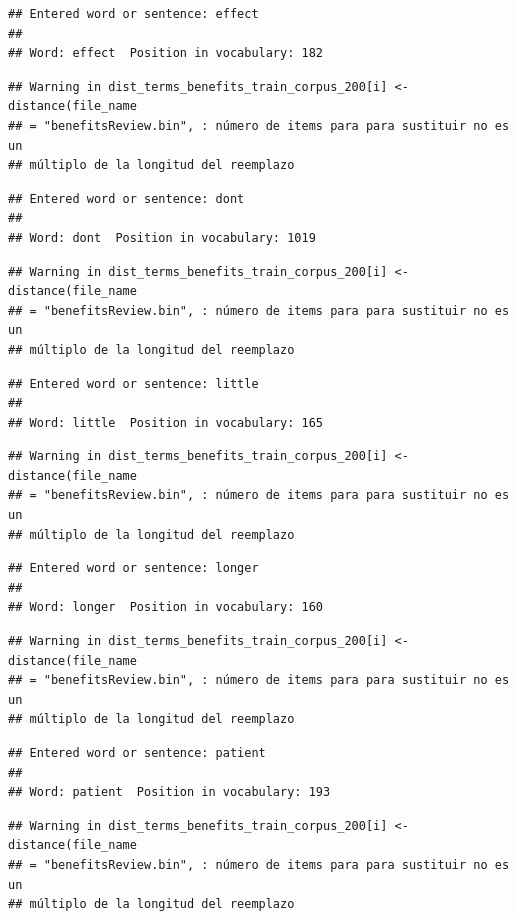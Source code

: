\documentclass[spanish,]{article}
\begin{document}
\begin{verbatim}
## Entered word or sentence: effect
## 
## Word: effect  Position in vocabulary: 182
\end{verbatim}

\begin{verbatim}
## Warning in dist_terms_benefits_train_corpus_200[i] <- distance(file_name
## = "benefitsReview.bin", : número de items para para sustituir no es un
## múltiplo de la longitud del reemplazo
\end{verbatim}

\begin{verbatim}
## Entered word or sentence: dont
## 
## Word: dont  Position in vocabulary: 1019
\end{verbatim}

\begin{verbatim}
## Warning in dist_terms_benefits_train_corpus_200[i] <- distance(file_name
## = "benefitsReview.bin", : número de items para para sustituir no es un
## múltiplo de la longitud del reemplazo
\end{verbatim}

\begin{verbatim}
## Entered word or sentence: little
## 
## Word: little  Position in vocabulary: 165
\end{verbatim}

\begin{verbatim}
## Warning in dist_terms_benefits_train_corpus_200[i] <- distance(file_name
## = "benefitsReview.bin", : número de items para para sustituir no es un
## múltiplo de la longitud del reemplazo
\end{verbatim}

\begin{verbatim}
## Entered word or sentence: longer
## 
## Word: longer  Position in vocabulary: 160
\end{verbatim}

\begin{verbatim}
## Warning in dist_terms_benefits_train_corpus_200[i] <- distance(file_name
## = "benefitsReview.bin", : número de items para para sustituir no es un
## múltiplo de la longitud del reemplazo
\end{verbatim}

\begin{verbatim}
## Entered word or sentence: patient
## 
## Word: patient  Position in vocabulary: 193
\end{verbatim}

\begin{verbatim}
## Warning in dist_terms_benefits_train_corpus_200[i] <- distance(file_name
## = "benefitsReview.bin", : número de items para para sustituir no es un
## múltiplo de la longitud del reemplazo
\end{verbatim}
\end{document}
